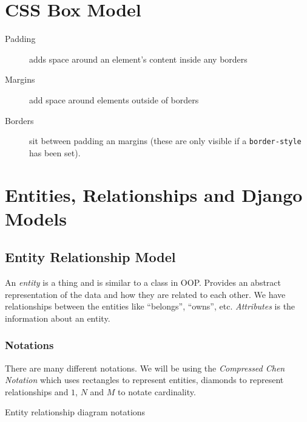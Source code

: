 \section{CSS Box Model}\label{sec:css_box_model}

\begin{description}
    \item[Padding] adds space around an element's content inside any borders
    \item[Margins] add space around elements outside of borders
    \item[Borders] sit between padding an margins (these are only visible if a \texttt{border-style} has been set).
\end{description}

\section{Entities, Relationships and Django Models}\label{sec:entities_relationships_and_django_models}

\subsection{Entity Relationship Model}\label{sub:entity_relationship_model}

An \emph{entity} is a thing and is similar to a class in OOP.
Provides an abstract representation of the data and how they are related to each other.
We have relationships between the entities like ``belongs'', ``owns'', etc.
\emph{Attributes} is the information about an entity.

\subsubsection{Notations}\label{ssub:notations}

There are many different notations.
We will be using the \emph{Compressed Chen Notation} which uses rectangles to represent entities, diamonds to represent relationships and \(1\), \(N\) and \(M\) to notate cardinality.

\begin{highlight}{Entity relationship diagram notations}
    \begin{center}
    \end{center}
\end{highlight}

